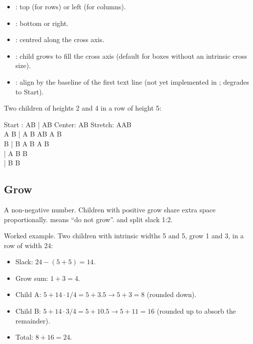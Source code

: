 \begin{itemize}[leftmargin=*]
  \item {}: top (for rows) or left (for columns).
  \item {}: bottom or right.
  \item {}: centred along the cross axis.
  \item {}: child grows to fill the cross axis
    (default for boxes without an intrinsic cross size).
  \item {}: align by the baseline of the first
    text line (not yet implemented in \maya{}; degrades to
    Start).
\end{itemize}

Two children of heights 2 and 4 in a row of height 5:

\begin{terminalbox}
Start   : AB  | AB    Center: AB    Stretch: AAB\\
          A B | A B           AB             A B\\
            B |   B          A B             A B\\
              |              A B               B\\
              |                B               B
\end{terminalbox}

\subsection*{Grow}

A non-negative number. Children with positive grow share extra
space proportionally.  means ``do not grow''.
 and  split slack 1:2.

Worked example. Two children with intrinsic widths 5 and 5,
grow 1 and 3, in a row of width 24:

\begin{itemize}[leftmargin=*]
  \item Slack: $24 - (5+5) = 14$.
  \item Grow sum: $1 + 3 = 4$.
  \item Child A: $5 + 14 \cdot 1/4 = 5 + 3.5 \to 5 + 3 = 8$
    (rounded down).
  \item Child B: $5 + 14 \cdot 3/4 = 5 + 10.5 \to 5 + 11 = 16$
    (rounded up to absorb the remainder).
  \item Total: $8 + 16 = 24$. \checkmark
\end{itemize}

